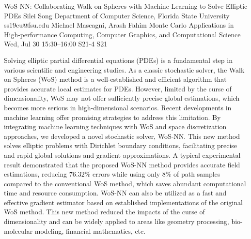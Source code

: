\begin{talk}
  {WoS-NN: Collaborating Walk-on-Spheres with Machine Learning to Solve Elliptic PDEs}%
  {Silei Song}%
  {Department of Computer Science, Florida State University}%
  {ss19cu@fsu.edu}%
  {Michael Mascagni, Arash Fahim}%
  {Monte Carlo Applications in High-performance Computing, Computer Graphics, and Computational Science}%
  {Wed, Jul 30 15:30–16:00}%
  {S21-4}%
  {S21}%
				
			
Solving elliptic partial differential equations (PDEs) is a fundamental step in various scientific and engineering studies. As a classic stochastic solver, the Walk on Spheres (WoS) method is a well-established and efficient algorithm that provides accurate local estimates for PDEs. However, limited by the curse of dimensionality, WoS may not offer sufficiently precise global estimations, which becomes more serious in high-dimensional scenarios. Recent developments in machine learning offer promising strategies to address this limitation. By integrating machine learning techniques with WoS and space discretization approaches, we developed a novel stochastic solver, WoS-NN. This new method solves elliptic problems with Dirichlet boundary conditions, facilitating precise and rapid global solutions and gradient approximations. A typical experimental result demonstrated that the proposed WoS-NN method provides accurate field estimations, reducing $76.32\%$ errors while using only $8\%$ of path samples compared to the conventional WoS method, which saves abundant computational time and resource consumption. WoS-NN can also be utilized as a fast and effective gradient estimator based on established implementations of the original WoS method. This new method reduced the impacts of the curse of dimensionality and can be widely applied to areas like geometry processing, bio-molecular modeling, financial mathematics, etc.

\medskip

\end{talk}

